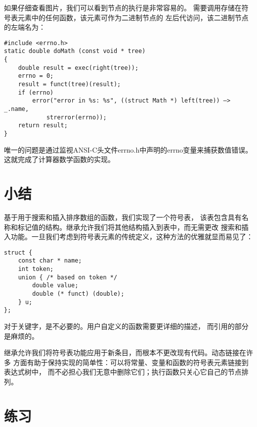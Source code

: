     如果仔细查看图片，我们可以看到节点的执行是非常容易的。
需要调用存储在符号表元素中的任何函数，该元素可作为二进制节点的
左后代访问，该二进制节点的左端名为：

\begin{lstlisting}
#include <errno.h> 
static double doMath (const void * tree) 
{ 
    double result = exec(right(tree)); 
    errno = 0; 
    result = funct(tree)(result); 
    if (errno) 
        error("error in %s: %s", ((struct Math *) left(tree)) —> _.name, 
            strerror(errno)); 
    return result; 
} 
\end{lstlisting}

    唯一的问题是通过监视ANSI-C头文件errno.h中声明的errno变量来捕获数值错误。
这就完成了计算器数学函数的实现。

\section{小结}

    基于用于搜索和插入排序数组的函数，我们实现了一个符号表，
该表包含具有名称和标记值的结构。继承允许我们将其他结构插入到表中，而无需更改
搜索和插入功能。一旦我们考虑到符号表元素的传统定义，这种方法的优雅就显而易见了：

\begin{lstlisting}
struct { 
    const char * name; 
    int token; 
    union { /* based on token */ 
        double value; 
        double (* funct) (double); 
    } u;
}; 
\end{lstlisting}

    对于关键字，是不必要的。用户自定义的函数需要更详细的描述，
而引用的部分是麻烦的。

    继承允许我们将符号表功能应用于新条目，而根本不更改现有代码。动态链接在许多
方面有助于保持实现的简单性：可以将常量、变量和函数的符号表元素链接到表达式树中，
而不必担心我们无意中删除它们；执行函数只关心它自己的节点排列。

\section{练习}

